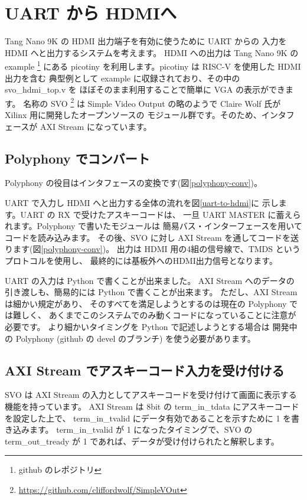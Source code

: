 \section{UART から HDMIへ}
Tang Nano 9K の HDMI 出力端子を有効に使うために UART からの
入力を HDMI へと出力するシステムを考えます。
HDMI への出力は Tang Nano 9K の example \footnote{github のレポジトリ} にある 
picotiny を利用します。picotiny は RISC-V を使用した HDMI 出力を含む
典型例として example に収録されており、その中の svo\_hdmi\_top.v を
ほぼそのまま利用することで簡単に VGA の表示ができます。
名称の
SVO
\footnote {
	\url{https://github.com/cliffordwolf/SimpleVOut}
}
は Simple Video Output の略のようで
Claire Wolf 氏が Xilinx 用に開発したオープンソースの
モジュール群です。そのため、インタフェースが AXI Stream になっています。

\subsection{Polyphony でコンバート}
Polyphony の役目はインタフェースの変換です(図\ref{polyphony-conv})。

UART で入力し HDMI へと出力する全体の流れを図\ref{uart-to-hdmi}に
示します。UART の RX で受けたアスキーコードは、
一旦 UART MASTER に蓄えられます。Polyphony で書いたモジュールは
簡易バス・インターフェースを用いてコードを読み込みます。
その後、SVO に対し AXI Stream を通してコードを送ります(図\ref{polyphony-conv})。
出力は HDMI 用の4組の信号線で、TMDS というプロトコルを使用し、
最終的には基板外へのHDMI出力信号となります。

UART の入力は Python で書くことが出来ました。
AXI Stream へのデータの引き渡しも、簡易的には Python で書くことが出来ます。
ただし、AXI Stream は細かい規定があり、
そのすべてを満足しようとするのは現在の Polyphony では難しく、
あくまでこのシステムでのみ動くコードになっていることに注意が必要です。
より細かいタイミングを Python で記述しようとする場合は
開発中の Polyphony (github の devel のブランチ) を使う必要があります。


\subsection{AXI Stream でアスキーコード入力を受け付ける}
SVO は AXI Stream の入力としてアスキーコードを受け付けて画面に表示する
機能を持っています。
AXI Stream は 8bit の term\_in\_tdata にアスキーコードを設定した上で、
term\_in\_tvalid にデータ有効であることを示すために 1 を書き込みます。
term\_in\_tvalid が 1 になったタイミングで、SVO の term\_out\_tready が
1 であれば、データが受け付けられたと解釈します。


